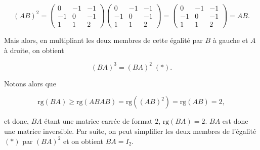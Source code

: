 {{$$(AB)^2=\left(
\begin{array}{ccc}
0&-1&-1\\
-1&0&-1\\
1&1&2
\end{array}
\right)\left(
\begin{array}{ccc}
0&-1&-1\\
-1&0&-1\\
1&1&2
\end{array}
\right)=\left(
\begin{array}{ccc}
0&-1&-1\\
-1&0&-1\\
1&1&2
\end{array}
\right)=AB.$$

Mais alors, en multipliant les deux membres de cette égalité par $B$ à gauche et $A$ à droite, on obtient

$$(BA)^3=(BA)^2\;(*).$$

Notons alors que 

$$\mbox{rg}(BA)\geq\mbox{rg}(ABAB)=\mbox{rg}((AB)^2)=\mbox{rg}(AB)=2,$$

et donc, $BA$ étant une matrice carrée de format $2$, $\mbox{rg}(BA)=2$. $BA$ est donc une matrice inversible. Par suite, on peut simplifier les deux membres de l'égalité $(*)$ par $(BA)^2$ et on obtient $BA=I_2$.}
}